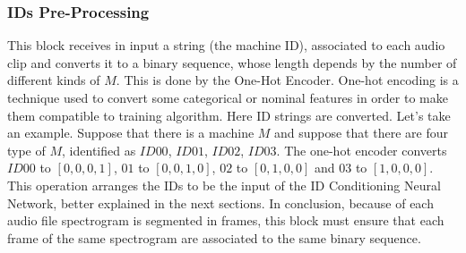 \subsubsection{IDs Pre-Processing}
This block receives in input a string (the machine ID), associated to each audio clip and converts it to a binary sequence, whose length depends by the number of different kinds of $M$. This is done by the One-Hot Encoder. One-hot encoding is a technique used to convert some categorical or nominal features in order to make them compatible to training algorithm. Here ID strings are converted. Let's take an example. Suppose that there is a machine $M$ and suppose that there are four type of $M$, identified as $ID00$, $ID01$, $ID02$, $ID03$. The one-hot encoder converts $ID00$ to $[0,0,0,1]$, $01$ to $[0,0,1,0]$, $02$ to $[0,1,0,0]$ and $03$ to $[1,0,0,0]$. This operation arranges the IDs to be the input of the ID Conditioning Neural Network, better explained in the next sections. In conclusion, because of each audio file spectrogram is segmented in frames, this block must ensure that each frame of the same spectrogram are associated to the same binary sequence.

